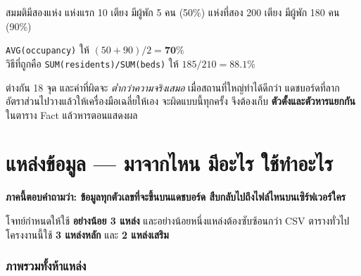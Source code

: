 \documentclass[11pt,a4paper]{article}
\newcommand{\code}[1]{\texttt{#1}}
\begin{document}
\begin{badbox}[title={ความผิดพลาดที่พบบ่อยที่สุดในงานคลังข้อมูล: เฉลี่ยของอัตราส่วน}]
สมมติมีสองแห่ง แห่งแรก 10 เตียง มีผู้พัก 5 คน (50\%) แห่งที่สอง 200 เตียง
มีผู้พัก 180 คน (90\%)

\vspace{0.3em}
\code{AVG(occupancy)} ให้ $(50+90)/2 = \mathbf{70\%}$ \\
วิธีที่ถูกคือ \code{SUM(residents)/SUM(beds)} ให้ $185/210 = \mathbf{88.1\%}$

\vspace{0.3em}
ต่างกัน 18 จุด และค่าที่ผิดจะ \emph{ต่ำกว่าความจริงเสมอ} เมื่อสถานที่ใหญ่ทำได้ดีกว่า
แดชบอร์ดที่ลากอัตราส่วนไปวางแล้วให้เครื่องมือเฉลี่ยให้เอง จะผิดแบบนี้ทุกครั้ง
จึงต้องเก็บ \textbf{ตัวตั้งและตัวหารแยกกัน} ในตาราง Fact แล้วหารตอนแสดงผล
\end{badbox}

\clearpage

\part{แหล่งข้อมูล — มาจากไหน มีอะไร ใช้ทำอะไร}

\textbf{ภาคนี้ตอบคำถามว่า: ข้อมูลทุกตัวเลขที่จะขึ้นบนแดชบอร์ด สืบกลับไปถึงไฟล์ไหนบนเซิร์ฟเวอร์ใคร}

โจทย์กำหนดให้ใช้ \textbf{อย่างน้อย 3 แหล่ง} และอย่างน้อยหนึ่งแหล่งต้องซับซ้อนกว่า
CSV ตารางทั่วไป โครงงานนี้ใช้ \textbf{3 แหล่งหลัก} และ \textbf{2 แหล่งเสริม}

\section{ภาพรวมทั้งห้าแหล่ง}
\end{document}
